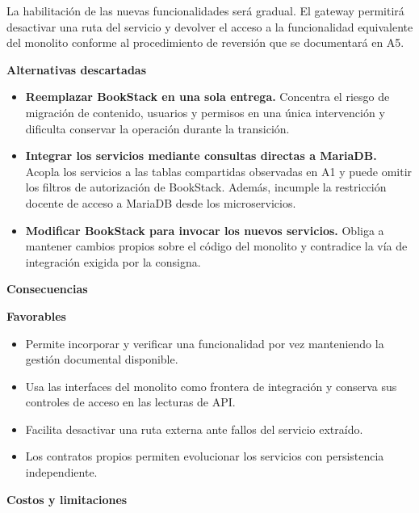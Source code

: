 La habilitación de las nuevas funcionalidades será gradual. El gateway permitirá desactivar una ruta del servicio y devolver el acceso a la funcionalidad equivalente del monolito conforme al procedimiento de reversión que se documentará en A5.

\par\medskip\noindent\textbf{Alternativas descartadas}\par\nobreak\smallskip

\begin{itemize}[leftmargin=1.5em,itemsep=3pt]
\item \textbf{Reemplazar BookStack en una sola entrega.} Concentra el riesgo de migración de contenido, usuarios y permisos en una única intervención y dificulta conservar la operación durante la transición.
\item \textbf{Integrar los servicios mediante consultas directas a MariaDB.} Acopla los servicios a las tablas compartidas observadas en A1 y puede omitir los filtros de autorización de BookStack. Además, incumple la restricción docente de acceso a MariaDB desde los microservicios.
\item \textbf{Modificar BookStack para invocar los nuevos servicios.} Obliga a mantener cambios propios sobre el código del monolito y contradice la vía de integración exigida por la consigna.
\end{itemize}

\par\medskip\noindent\textbf{Consecuencias}\par\nobreak\smallskip

\par\medskip\noindent\textbf{Favorables}\par\nobreak\smallskip

\begin{itemize}[leftmargin=1.5em,itemsep=3pt]
\item Permite incorporar y verificar una funcionalidad por vez manteniendo la gestión documental disponible.
\item Usa las interfaces del monolito como frontera de integración y conserva sus controles de acceso en las lecturas de API.
\item Facilita desactivar una ruta externa ante fallos del servicio extraído.
\item Los contratos propios permiten evolucionar los servicios con persistencia independiente.
\end{itemize}

\par\medskip\noindent\textbf{Costos y limitaciones}\par\nobreak\smallskip

